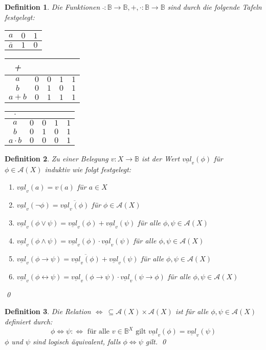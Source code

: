 \documentclass[ngerman]{scrartcl}
\theoremstyle{custom}
\newtheorem{mdef}{Definition} \numberwithin{mdef}{subsection}
\newcommand{\ax}{\mathcal{A}(X)}
\newcommand{\val}{\underline{val}_v}
\newcommand{\0}{\mathbf{0}}
\newcommand{\1}{\mathbf{L}}
\begin{document}
\begin{mdef} Die Funktionen $\bar{ }: \mathds{B} \rightarrow
  \mathds{B}, +, \cdot: \mathds{B} \rightarrow \mathds{B}$ sind durch
  die folgende Tafeln festgelegt:\\
\begin{tabular}{c|cc}
$a$ & $0$ & $1$ \\
\hline $\overline{a}$ & $1$ & $0$
\end{tabular}
\begin{tabular}{c|cccc}
+ & & & & \\
\hline $a$ & $0$ & $0$ & $1$ & $1$ \\
$b$ & $0$ & $1$ & $0$ & $1$\\
$a+b$ & $0$ & $1$ & $1$ & $1$ \\
\end{tabular}
\begin{tabular}{c|cccc}
$\cdot$ & & & & \\
\hline $a$ & $0$ & $0$ & $1$ & $1$ \\
$b$ & $0$ & $1$ & $0$ & $1$\\
$a \cdot b$ & $0$ & $0$ & $0$ & $1$ \\
\end{tabular}
\end{mdef}

\begin{mdef} Zu einer Belegung $v: X \rightarrow \mathds{B}$ ist der
  Wert $\underline{val}_v(\phi)$ f\"ur $\phi \in \ax$ induktiv wie
  folgt festgelegt:
\begin{enumerate}
\item $\val(a) = v(a)$ f\"ur $a \in X$
\item $\val(\neg \phi) = \overline{\val(\phi)}$ f\"ur $\phi \in \ax$
\item $\val(\phi \vee \psi) = \val(\phi) + \val(\psi)$ f\"ur alle $\phi,
  \psi \in \ax$
\item $\val(\phi \wedge \psi) = \val(\phi) \cdot \val(\psi)$
  f\"ur alle $\phi, \psi \in \ax$
\item $\val(\phi \rightarrow \psi) = \overline{\val(\phi)} +
  \val(\psi)$ f\"ur alle $\phi, \psi \in \ax$
\item $\val(\phi \leftrightarrow \psi) = \val(\phi \rightarrow \psi) \cdot
  \val(\psi \rightarrow \phi)$ f\"ur alle $\phi, \psi \in \ax$
\end{enumerate}
\qed
\end{mdef}

\begin{mdef}
Die Relation $\Leftrightarrow ~ \subseteq \ax \times \ax$ ist f\"ur alle
$\phi, \psi \in \ax$ definiert durch:\\
\begin{equation*}
\phi \Leftrightarrow \psi :\Longleftrightarrow \text{ f\"ur alle } v \in
\mathds{B}^X \text{ gilt } \val(\phi) = \val(\psi)
\end{equation*}
$\phi$ und $\psi$ sind \emph{logisch \"aquivalent}, falls $\phi
\Leftrightarrow \psi$ gilt. \qed
\end{mdef}
\end{document}
